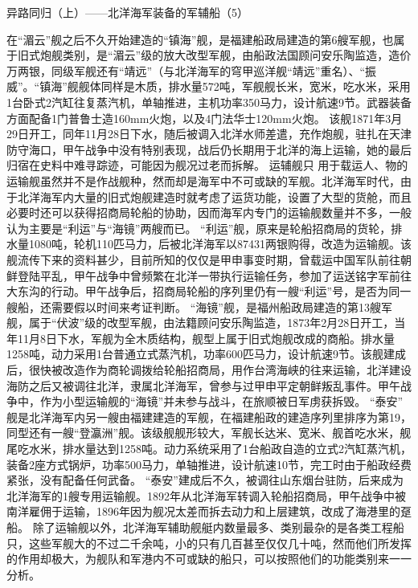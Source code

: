 \documentclass[12pt,UTF8]{ctexbook}
\begin{document}
异路同归（上）——北洋海军装备的军辅船（5）

在“湄云”舰之后不久开始建造的“镇海”舰，是福建船政局建造的第6艘军舰，也属于旧式炮舰类别，是“湄云”级的放大改型军舰，由船政法国顾问安乐陶监造，造价万两银，同级军舰还有“靖远”（与北洋海军的穹甲巡洋舰“靖远”重名）、“振威”。“镇海”舰舰体同样是木质，排水量572吨，军舰舰长米，宽米，吃水米，采用1台卧式2汽缸往复蒸汽机，单轴推进，主机功率350马力，设计航速9节。武器装备方面配备1门普鲁士造160mm火炮，以及4门法华士120mm火炮。 该舰1871年3月29日开工，同年11月28日下水，随后被调入北洋水师差遣，充作炮舰，驻扎在天津防守海口，甲午战争中没有特别表现，战后仍长期用于北洋的海上运输，她的最后归宿在史料中难寻踪迹，可能因为舰况过老而拆解。
运辅舰只
用于载运人、物的运输舰虽然并不是作战舰种，然而却是海军中不可或缺的军舰。北洋海军时代，由于北洋海军内大量的旧式炮舰建造时就考虑了运货功能，设置了大型的货舱，而且必要时还可以获得招商局轮船的协助，因而海军内专门的运输舰数量并不多，一般认为主要是“利运”与“海镜”两艘而已。
“利运”舰，原来是轮船招商局的货轮，排水量1080吨，轮机110匹马力，后被北洋海军以87431两银购得，改造为运输舰。该舰流传下来的资料甚少，目前所知的仅仅是甲申事变时期，曾载运中国军队前往朝鲜登陆平乱，甲午战争中曾频繁在北洋一带执行运输任务，参加了运送铭字军前往大东沟的行动。甲午战争后，招商局轮船的序列里仍有一艘“利运”号，是否为同一艘船，还需要假以时间来考证判断。
“海镜”舰，是福州船政局建造的第13艘军舰，属于“伏波”级的改型军舰，由法籍顾问安乐陶监造，1873年2月28日开工，当年11月8日下水，军舰为全木质结构，舰型上属于旧式炮舰改成的商船。排水量1258吨，动力采用1台普通立式蒸汽机，功率600匹马力，设计航速9节。该舰建成后，很快被改造作为商轮调拨给轮船招商局，用作台湾海峡的往来运输，北洋建设海防之后又被调往北洋，隶属北洋海军，曾参与过甲申平定朝鲜叛乱事件。甲午战争中，作为小型运输舰的“海镜”并未参与战斗，在旅顺被日军虏获拆毁。
“泰安” 舰是北洋海军内另一艘由福建建造的军舰，在福建船政的建造序列里排序为第19，同型还有一艘“登瀛洲”舰。该级舰舰形较大，军舰长达米、宽米、舰首吃水米，舰尾吃水米，排水量达到1258吨。动力系统采用了1台船政自造的立式2汽缸蒸汽机，装备2座方式锅炉，功率500马力，单轴推进，设计航速10节，完工时由于船政经费紧张，没有配备任何武备。
“泰安”建成后不久，被调往山东烟台驻防，后来成为北洋海军的1艘专用运输舰。1892年从北洋海军转调入轮船招商局，甲午战争中被南洋雇佣于运输，1896年因为舰况太差而拆去动力和上层建筑，改成了海港里的趸船。
除了运输舰以外，北洋海军辅助舰艇内数量最多、类别最杂的是各类工程船只，这些军舰大的不过二千余吨，小的只有几百甚至仅仅几十吨，然而他们所发挥的作用却极大，为舰队和军港内不可或缺的船只，可以按照他们的功能类别来一一分析。
\end{document}
